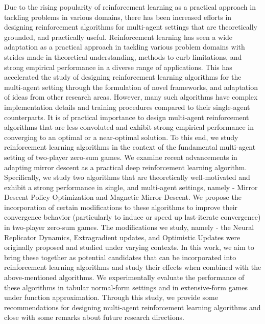 \documentclass{uicthesi}
\newcounter{problem}
\begin{document}
\summary Due to the rising
popularity of reinforcement learning as a practical approach in tackling problems in various
domains, there has been increased efforts in designing reinforcement algorithms for multi-agent
settings that are theoretically grounded, and practically useful.
Reinforcement learning has seen a wide adaptation as a practical approach in tackling various
problem domains with strides made in theoretical understanding, methods to curb limitations, and
strong empirical performance in a diverse range of applications.
This has accelerated the study of designing reinforcement learning algorithms for the multi-agent
setting through the formulation of novel frameworks, and adaptation of ideas from other research
areas.
However, many such algorithms have complex implementation details and training procedures compared
to their single-agent counterparts.
It is of practical importance to design multi-agent reinforcement algorithms that are less
convoluted and exhibit strong empirical performance in converging to an optimal or a near-optimal
solution.
To this end, we study reinforcement learning algorithms in the context of the fundamental
multi-agent setting of two-player zero-sum games.
We examine recent advancements in adapting mirror descent as a practical deep reinforcement
learning algorithm.
Specifically, we study two algorithms that are theoretically well-motivated and exhibit a strong
performance in single, and multi-agent settings, namely - Mirror Descent Policy Optimization and
Magnetic Mirror Descent.
We propose the incorporation of certain modifications to these algorithms to improve their
convergence behavior (particularly to induce or speed up last-iterate convergence) in two-player
zero-sum games.
The modifications we study, namely - the Neural Replicator Dynamics, Extragradient updates, and
Optimistic Updates were originally proposed and studied under varying contexts.
In this work, we aim to bring these together as potential candidates that can be incorporated into
reinforcement learning algorithms and study their effects when combined with the above-mentioned
algorithms.
We experimentally evaluate the performance of these algorithms in tabular normal-form settings and
in extensive-form games under function approximation.
Through this study, we provide some recommendations for designing multi-agent reinforcement
learning algorithms and close with some remarks about future research directions.











% 
% 

\appendices
\newpage
\appendix


\bibformb

\newpage
\end{document}
